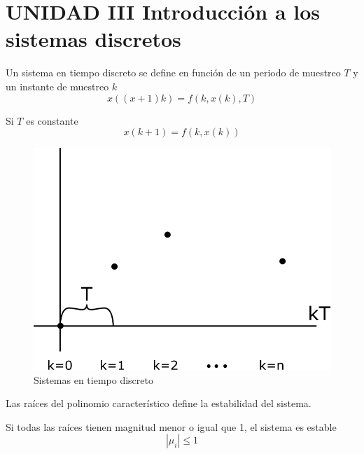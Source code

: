\section{UNIDAD III Introducción a los sistemas discretos}

Un sistema en tiempo discreto se define en función de un periodo de muestreo \( T \) y un instante de muestreo \( k \)
\[
    x((x+1)k) = f(k,x(k), T)
\]

Si \( T \) es constante
\[
    x(k+1) = f(k, x(k))
\]

\begin{figure}[h!]
    \centering
        \includegraphics[scale=0.30]{Control de Sistemas Mecatronicos Figuras/19 Sistema en Tiempo Discreto.png}
        \caption{Sistemas en tiempo discreto}
\end{figure}

Las raíces del polinomio característico define la estabilidad del sistema.

Si todas las raíces tienen magnitud menor o igual que 1, el sistema es estable
\[
    |\mu_{i}| \leq 1
\]